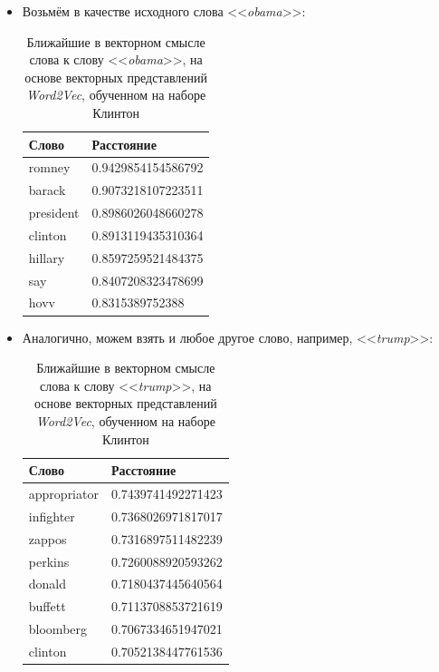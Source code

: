 \begin{itemize}
\item Возьмём в качестве исходного слова <<\textit{obama}>>:

\begin{table}[H]
\centering
\begin{tabular}{ | l | l | }
\hline
Слово & Расстояние \\ \hline
romney & 0.9429854154586792 \\ \hline
barack & 0.9073218107223511 \\ \hline
president & 0.8986026048660278 \\ \hline
clinton & 0.8913119435310364 \\ \hline
hillary & 0.8597259521484375 \\ \hline
say & 0.8407208323478699 \\ \hline
hovv & 0.8315389752388 \\ \hline
\end{tabular}
\caption{Ближайшие в векторном смысле слова к слову <<\textit{obama}>>, 
на основе векторных представлений \textit{Word2Vec}, обученном на наборе Клинтон}
\end{table}

\item Аналогично, можем взять и любое другое слово, например, <<\textit{trump}>>:

\begin{table}[H]
\centering
\begin{tabular}{ | l | l | }
\hline
Слово & Расстояние \\ \hline
appropriator & 0.7439741492271423 \\ \hline
infighter & 0.7368026971817017 \\ \hline
zappos & 0.7316897511482239 \\ \hline
perkins & 0.7260088920593262 \\ \hline
donald & 0.7180437445640564 \\ \hline
buffett &  0.7113708853721619 \\ \hline
bloomberg & 0.7067334651947021 \\ \hline
clinton &  0.7052138447761536 \\ \hline
\end{tabular}
\caption{Ближайшие в векторном смысле слова к слову <<\textit{trump}>>, 
на основе векторных представлений \textit{Word2Vec}, обученном на наборе Клинтон}
\end{table}
\end{itemize}

